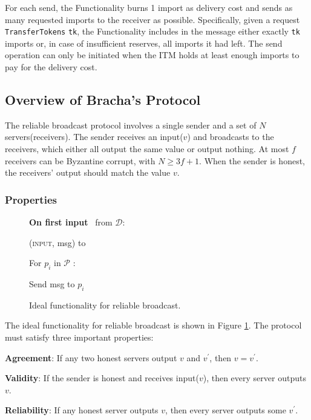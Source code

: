 For each send, the Functionality burns 1 import as delivery cost and sends as many requested imports to the receiver as possible. Specifically, given a request \texttt{TransferTokens} \texttt{tk}, the Functionality includes in the message either exactly \texttt{tk} imports or, in case of insufficient reserves, all imports it had left. The send operation can only be initiated when the ITM holds at least enough imports to pay for the delivery cost.

\subsection{Overview of Bracha's Protocol}
The reliable broadcast protocol involves a single sender and a set of $N$ servers(receivers). The sender receives an input($v$) and broadcasts to the receivers, which either all output the same value or output nothing. At most $f$ receivers can be Byzantine corrupt, with $N\geq 3f+1$. When the sender is honest, the receivers' output should match the value $v$.

\subsubsection{Properties}
\begin{figure}
    \centering
    \begin{bbox}[title={$\mathcal{F}_\msf{RBC}(\mathcal{P})$}]

    {\bf \color{Black} On first input}~  from $\mathcal{D}$:

    \quad \Leak (\textsc{input}, msg) to \Adv
    
    \quad For $p_i$ in $\mathcal{P}$ :
    
        \qquad \Eventually Send msg to $p_i$

\end{bbox}
    \caption{Ideal functionality for reliable broadcast.}
    \label{fig:f_code}
\end{figure}
The ideal functionality for reliable broadcast is shown in Figure \ref{fig:f_code}. The protocol must satisfy three important properties:

\textbf{Agreement}: If any two honest servers output $v$ and $v^{\prime}$, then $v = v^{\prime}$.

\textbf{Validity}: If the sender is honest and receives input($v$), then every server outputs $v$.

\textbf{Reliability}: If any honest server outputs $v$, then every server outputs some $v^{\prime}$.


